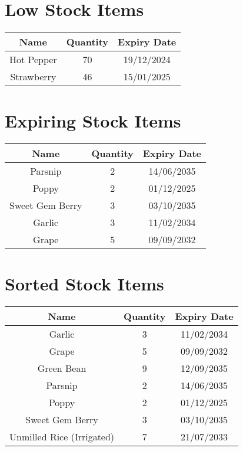 \documentclass{article}
\begin{document}
\section*{Low Stock Items}
\begin{tabular}{|c|c|c|}
\hline
Name & Quantity & Expiry Date\\
\hline
Hot Pepper & 70 & 19/12/2024 \\
\hline
Strawberry & 46 & 15/01/2025 \\
\hline
\end{tabular}

\section*{Expiring Stock Items}
\begin{tabular}{|c|c|c|}
\hline
Name & Quantity & Expiry Date\\
\hline
Parsnip & 2 & 14/06/2035 \\
\hline
Poppy & 2 & 01/12/2025 \\
\hline
Sweet Gem Berry & 3 & 03/10/2035 \\
\hline
Garlic & 3 & 11/02/2034 \\
\hline
Grape & 5 & 09/09/2032 \\
\hline
\end{tabular}

\section*{Sorted Stock Items}
\begin{tabular}{|c|c|c|}
\hline
Name & Quantity & Expiry Date\\
\hline
Garlic & 3 & 11/02/2034 \\
\hline
Grape & 5 & 09/09/2032 \\
\hline
Green Bean & 9 & 12/09/2035 \\
\hline
Parsnip & 2 & 14/06/2035 \\
\hline
Poppy & 2 & 01/12/2025 \\
\hline
Sweet Gem Berry & 3 & 03/10/2035 \\
\hline
Unmilled Rice (Irrigated) & 7 & 21/07/2033 \\
\hline
\end{tabular}
\end{document}
